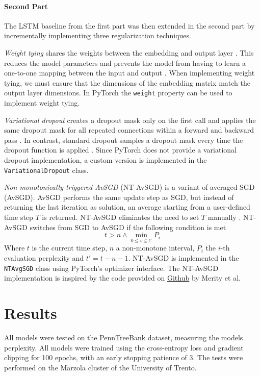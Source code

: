 \documentclass[a4paper]{article}
\begin{document}
\paragraph*{Second Part}
The LSTM baseline from the first part was then extended in the second part by incrementally implementing three regularization techniques.

\emph{Weight tying} \cite{inan2016tying,press2016using} shares the weights between the embedding and output layer \cite{merity2017regularizing}. This reduces the model parameters and prevents the model from having to learn a one-to-one mapping between the input and output \cite{merity2017regularizing}. When implementing weight tying, we must ensure that the dimensions of the embedding matrix match the output layer dimensions. In PyTorch the \texttt{weight} property can be used to implement weight tying. 

\emph{Variational dropout} \cite{gal2016theoretically} creates a dropout mask only on the first call and applies the same dropout mask for all repeated connections within a forward and backward pass \cite{merity2017regularizing}. In contrast, standard dropout samples a dropout mask every time the dropout function is applied \cite{merity2017regularizing}. Since PyTorch does not provide a variational dropout implementation, a custom version is implemented in the \texttt{VariationalDropout} class. 

\emph{Non-monotonically triggered AvSGD} (NT-AvSGD) \cite{merity2017regularizing} is a variant of averaged SGD (AvSGD). AvSGD performs the same update step as SGD, but instead of returning the last iteration as solution, an average starting from a user-defined time step $T$ is returned. NT-AvSGD eliminates the need to set $T$ manually \cite{merity2017regularizing}. NT-AvSGD switches from SGD to AvSGD if the following condition is met
\[
  t > n \land \min_{0 \le i \le t'} P_i
\]
Where $t$ is the current time step, $n$ a non-monotone interval, $P_i$ the $i$-th evaluation perplexity and $t' = t-n-1$. NT-AvSGD is implemented in the \texttt{NTAvgSGD} class using PyTorch's optimizer interface. The NT-AvSGD implementation is inspired by the code provided on \href{https://github.com/salesforce/awd-lstm-lm}{Github} by Merity et al. \cite{merity2017regularizing} 

\section{Results}
All models were tested on the PennTreeBank dataset, measuring the models perplexity. All models were trained using the cross-entropy loss and gradient clipping for 100 epochs, with an early stopping patience of 3. The tests were performed on the Marzola cluster of the University of Trento.
\end{document}
